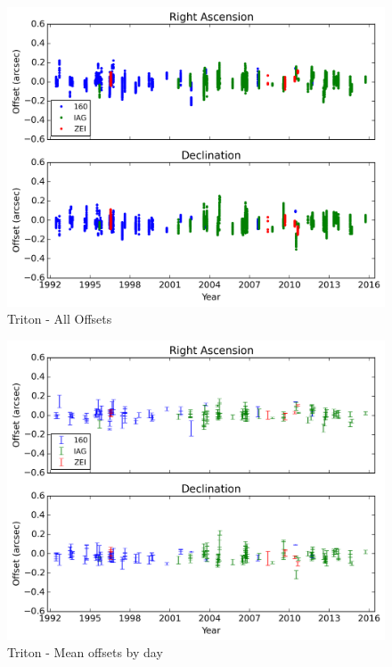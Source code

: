\documentclass[12pt,a4paper]{report}
\begin{document}
\begin{figure}
\includegraphics[width=16.0cm]{Triton_all.png} 
\caption{Triton - All Offsets}
\label{Fig:triton-all}
\end{figure}
\begin{figure}
\includegraphics[width=16.0cm]{Triton_media.png} 
\caption{Triton - Mean offsets by day}
\label{Fig:trito-media}
\end{figure}
\end{document}
